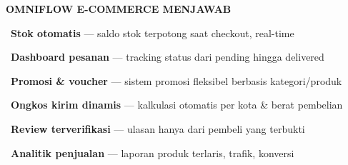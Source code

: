 \documentclass[a4paper]{article}
\begin{document}
\begin{minipage}[t]{0.485\textwidth}
    \colorbox{EmeraldPrimary}{%
        \begin{minipage}{\dimexpr\textwidth-14pt}
            \vspace{5pt}
            {\fontsize{10}{13}\selectfont\bfseries\color{White} OMNIFLOW E-COMMERCE MENJAWAB}
            \vspace{5pt}
        \end{minipage}}
    \vspace{6pt}

    {\fontsize{9.5}{13}\selectfont\color{TextDark}%
    \textbullet\ \textbf{Stok otomatis} --- saldo stok terpotong saat checkout, real-time\par\vspace{4pt}%
    \textbullet\ \textbf{Dashboard pesanan} --- tracking status dari pending hingga delivered\par\vspace{4pt}%
    \textbullet\ \textbf{Promosi \& voucher} --- sistem promosi fleksibel berbasis kategori/produk\par\vspace{4pt}%
    \textbullet\ \textbf{Ongkos kirim dinamis} --- kalkulasi otomatis per kota \& berat pembelian\par\vspace{4pt}%
    \textbullet\ \textbf{Review terverifikasi} --- ulasan hanya dari pembeli yang terbukti\par\vspace{4pt}%
    \textbullet\ \textbf{Analitik penjualan} --- laporan produk terlaris, trafik, konversi}%
\end{minipage}

\vspace{8pt}
\end{document}
